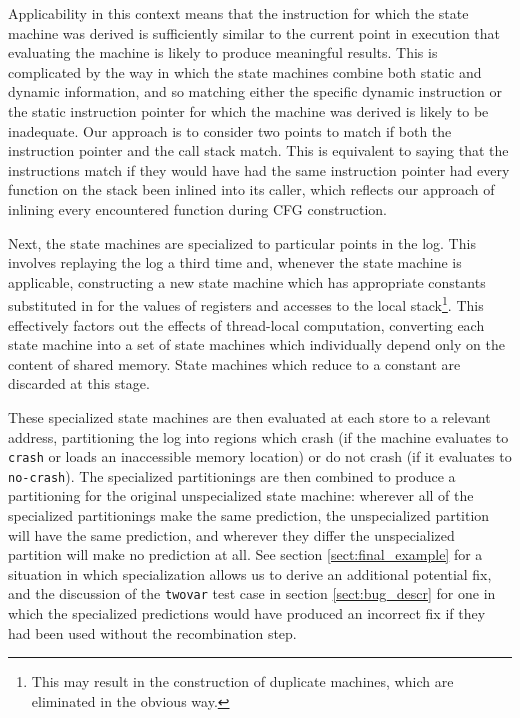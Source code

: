 \documentclass[10pt,twocolumn,preprint,natbib,authoryear]{sigplanconf}
\newcommand{\editorial}[1]{}
\begin{document}
Applicability in this context means that the instruction for which the
state machine was derived is sufficiently similar to the current point
in execution that evaluating the machine is likely to produce
meaningful results.  This is complicated by the way in which the state
machines combine both static and dynamic information, and so matching
either the specific dynamic instruction or the static instruction
pointer for which the machine was derived is likely to be inadequate.
Our approach is to consider two points to match if both the
instruction pointer and the call stack match.  This is equivalent to
saying that the instructions match if they would have had the same
instruction pointer had every function on the stack been inlined into
its caller, which reflects our approach of inlining every encountered
function during CFG construction.

Next, the state machines are specialized to particular points in the
log.  This involves replaying the log a third time and, whenever the
state machine is applicable, constructing a new state machine which
has appropriate constants substituted in for the values of registers
and accesses to the local stack\footnote{This may result in the
  construction of duplicate machines, which are eliminated in the
  obvious way.}.  This effectively factors out the effects of
thread-local computation, converting each state machine into a set of
state machines which individually depend only on the content of shared
memory.  State machines which reduce to a constant are discarded at
this stage.

These specialized state machines are then evaluated at each store to a
relevant address, partitioning the log into regions which crash (if
the machine evaluates to \verb|crash| or loads an inaccessible memory
location) or do not crash (if it evaluates to \verb|no-crash|).  The
specialized partitionings are then combined to produce a partitioning
for the original unspecialized state machine: wherever all of the
specialized partitionings make the same prediction, the unspecialized
partition will have the same prediction, and wherever they differ the
unspecialized partition will make no prediction at all.  See section
\ref{sect:final_example} for a situation in which specialization
allows us to derive an additional potential fix, and the discussion of
the \verb|twovar| test case in section \ref{sect:bug_descr} for one in
which the specialized predictions would have produced an incorrect fix
if they had been used without the recombination step.\editorial{Need
  more explanation of why we're doing this.}
\end{document}

